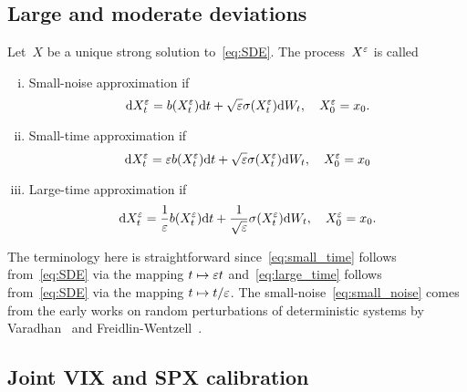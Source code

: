\subsection{Large and moderate deviations}
\begin{definition}\label{def:LDP_approximation_types}
Let~$X$ be a unique strong solution to~\eqref{eq:SDE}.
The process~$X^\varepsilon$ is called
\begin{enumerate}[i)]
\item Small-noise approximation if 
\begin{equation}\label{eq:small_noise}
\mathrm{d} X_t^\varepsilon = b(X_t^\varepsilon) \mathrm{d} t + \sqrt{\varepsilon} \sigma(X_t^\varepsilon)\mathrm{d} W_t, \quad X_0^\varepsilon = x_0.
\end{equation}
\item Small-time approximation if 
\begin{equation}\label{eq:small_time}
\mathrm{d} X_t^\varepsilon = \varepsilon b(X_t^\varepsilon) \mathrm{d} t + \sqrt{\varepsilon} \sigma(X_t^\varepsilon) \mathrm{d} W_t, \quad X_0^\varepsilon = x_0
\end{equation}
\item Large-time approximation if 
\begin{equation}\label{eq:large_time}
\mathrm{d} X_t^\varepsilon = \frac{1}{\varepsilon} b(X_t^\varepsilon) \mathrm{d} t + \frac{1}{\sqrt{\varepsilon}} \sigma(X_t^\varepsilon) \mathrm{d} W_t, \quad X_0^\varepsilon = x_0.
\end{equation}
\end{enumerate}
\end{definition}
The terminology here is straightforward since~\eqref{eq:small_time} follows from~\eqref{eq:SDE} via the mapping $t \mapsto \varepsilon t$
and~\eqref{eq:large_time} follows from~\eqref{eq:SDE} via the mapping
$t\mapsto t/\varepsilon$.
The small-noise~\eqref{eq:small_noise}
comes from the early works 
on random perturbations of deterministic systems by Varadhan~\cite{Varadhan1967DiffusionInterval} and Freidlin-Wentzell~\cite{Freidlin2012RandomSystems}.


\subsection{Joint VIX and SPX calibration}
